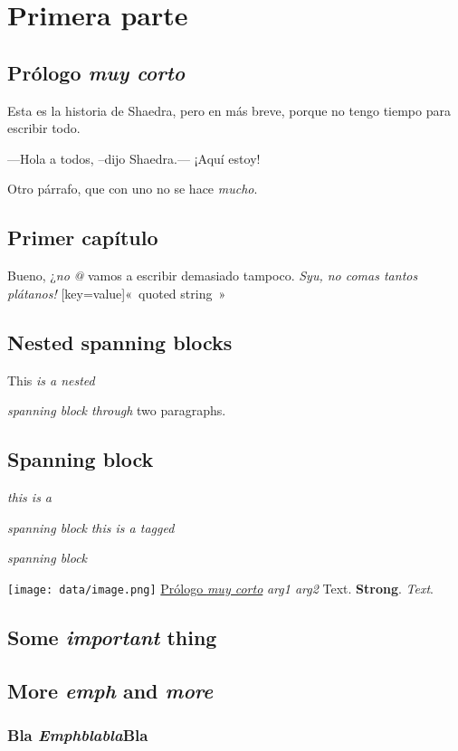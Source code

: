 \part{Primera parte}
\label{s:1}
\chapter{Prólogo \emph{muy corto}}
\label{s:2}
Esta es la historia de Shaedra, pero en más breve, porque no tengo tiempo para
escribir todo.

---Hola a todos, –dijo Shaedra.— ¡Aquí estoy!

Otro párrafo, que con uno no se hace
\textit{mucho}.

\chapter{Primer capítulo}
\label{s:3}
Bueno, ¿\emph{no}
\emph{@}
vamos a escribir demasiado tampoco.
\textit{Syu, no comas tantos plátanos!}
\textrm[key=value]{«~quoted string~»}

\chapter{Nested spanning blocks}
\label{s:4}
This
\emph{is a
\emph{nested}}

\emph{\emph{spanning}
block through}
two paragraphs.

\chapter{Spanning block}
\label{s:5}
\emph{this is a}

\emph{spanning block}
\textit{this is a tagged}

\textit{spanning block}

\texttt{[image: data/image.png]}
\hyperref[s:2]{Prólogo \emph{muy corto}}
\emph{arg1 arg2}
Text.
\textbf{Strong}.
\emph{\emph{Text}}.

\chapter{Some \emph{important} thing}
\label{s:6}
\chapter{More \emph{emph} and \emph{more}}
\label{s:7}
\section{Bla \textit{Emphblabla}Bla}
\label{s:8}
